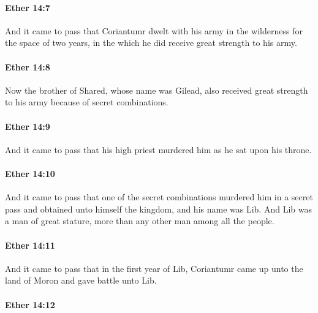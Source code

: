 		\paragraph{Ether 14:7} %
			\label{ETHER-14-7}

			And it came to pass that
			Coriantumr dwelt with his army in the wilderness for the space of two years,
			in the which he did receive great strength to his army.

		\paragraph{Ether 14:8} %
			\label{ETHER-14-8}

			Now the brother of Shared, whose name was Gilead,
			also received great strength to his army because of secret combinations.

		\paragraph{Ether 14:9} %
			\label{ETHER-14-9}

			And it came to pass that his high priest murdered him as he sat upon his throne.

		\paragraph{Ether 14:10} %
			\label{ETHER-14-10}

			And it came to pass that
			one of the secret combinations murdered him in a secret pass
			and obtained unto himself the kingdom,
			and his name was Lib.
			And Lib was a man of great stature,
			more than any other man among all the people.

		\paragraph{Ether 14:11} %
			\label{ETHER-14-11}

			And it came to pass that in the first year of Lib,
			Coriantumr came up unto the land of Moron and gave battle unto Lib.

		\paragraph{Ether 14:12} %
			\label{ETHER-14-12}

